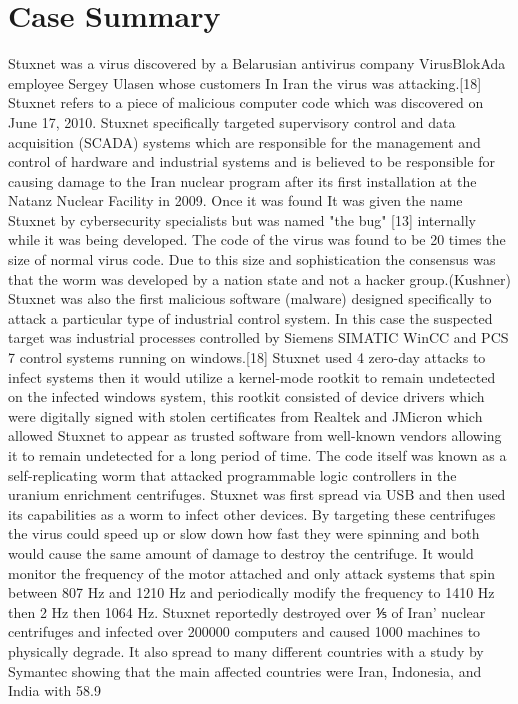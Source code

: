 \section{Case Summary}
Stuxnet was a virus discovered by a Belarusian antivirus company VirusBlokAda employee Sergey Ulasen whose customers In Iran the virus was attacking.[18] Stuxnet refers to a piece of malicious computer code which was discovered on June 17, 2010. Stuxnet specifically targeted supervisory control and data acquisition (SCADA) systems which are responsible for the management and control of hardware and industrial systems and is believed to be responsible for causing damage to the Iran nuclear program after its first installation at the Natanz Nuclear Facility in 2009. Once it was found It was given the name Stuxnet by cybersecurity specialists but was named "the bug" [13]  internally while it was being developed. The code of the virus was found to be 20 times the size of normal virus code. Due to this size and sophistication the consensus was that the worm was developed by a nation state and not a hacker group.(Kushner) Stuxnet was also the first malicious software (malware) designed specifically to attack a particular type of industrial control system. In this case the suspected target was industrial processes controlled by Siemens SIMATIC WinCC and PCS 7 control systems running on windows.[18] Stuxnet used 4 zero-day attacks to infect systems then it would utilize a kernel-mode rootkit to remain undetected on the infected windows system, this rootkit consisted of device drivers which were digitally signed with stolen certificates from Realtek and JMicron which allowed Stuxnet to appear as trusted software from well-known vendors allowing it to remain undetected for a long period of time. The code itself was known as a self-replicating worm that attacked programmable logic controllers in the uranium enrichment centrifuges. Stuxnet was first spread via USB and then used its capabilities as a worm to infect other devices. By targeting these centrifuges the virus could speed up or slow down how fast they were spinning and both would cause the same amount of damage to destroy the centrifuge. It would monitor the frequency of the motor attached and only attack systems that spin between 807 Hz and 1210 Hz and periodically modify the frequency to 1410 Hz then 2 Hz then 1064 Hz. Stuxnet reportedly destroyed over ⅕ of Iran’ nuclear centrifuges and infected over 200000 computers and caused 1000 machines to physically degrade. It also spread to many different countries with a study by Symantec showing that the main affected countries were Iran, Indonesia, and India with 58.9%